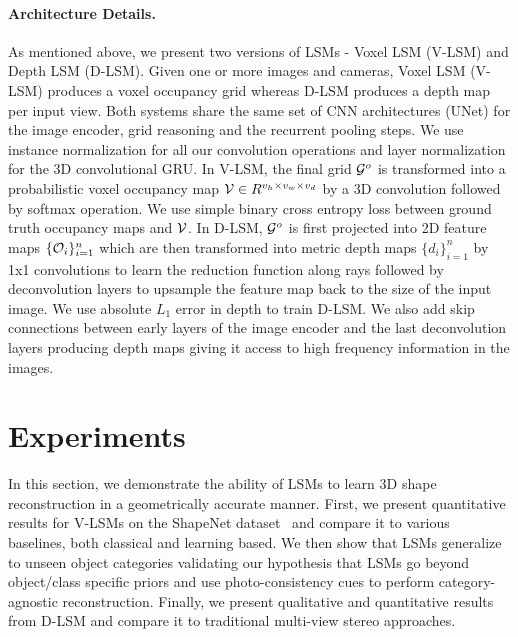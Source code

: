 \documentclass[../thesis.tex]{subfiles}
\begin{document}
\paragraph{Architecture Details.}
As mentioned above, we present two versions of LSMs - Voxel LSM (V-LSM) and Depth LSM (D-LSM). Given one or more images and cameras, Voxel LSM (V-LSM) produces a voxel occupancy grid whereas D-LSM produces a depth map per input view. Both systems share the same set of CNN architectures (UNet) for the image encoder, grid reasoning and the recurrent pooling steps. We use instance normalization for all our convolution operations and layer normalization for the 3D convolutional GRU. In V-LSM, the final grid $\mathcal{G}^o$ is transformed into a probabilistic voxel occupancy map $\mathcal{V} \in R^{v_h \times v_w \times v_d}$ by a 3D convolution followed by softmax operation. We use simple binary cross entropy loss between ground truth occupancy maps and $\mathcal{V}$. In D-LSM, $\mathcal{G}^o$ is first projected into 2D feature maps $\{\mathcal{O}_i\}_{i=1}^{n}$ which are then transformed into metric depth maps $\{d_i\}_{i=1}^{n}$ by 1x1 convolutions to learn the reduction function along rays followed by deconvolution layers to upsample the feature map back to the size of the input image. We use absolute $L_1$ error in depth to train D-LSM. We also add skip connections between early layers of the image encoder and the last deconvolution layers producing depth maps giving it access to high frequency information in the images.



\section{Experiments}
In this section, we demonstrate the ability of LSMs to learn 3D shape reconstruction in a geometrically accurate manner. First, we present quantitative results for V-LSMs on the ShapeNet dataset~\cite{shapenet2015} and compare it to various baselines, both classical and learning based. We then show that LSMs generalize to unseen object categories validating our hypothesis that LSMs go beyond object/class specific priors and use photo-consistency cues to perform category-agnostic reconstruction. Finally, we present qualitative and quantitative results from D-LSM and compare it to traditional multi-view stereo approaches.
\end{document}
